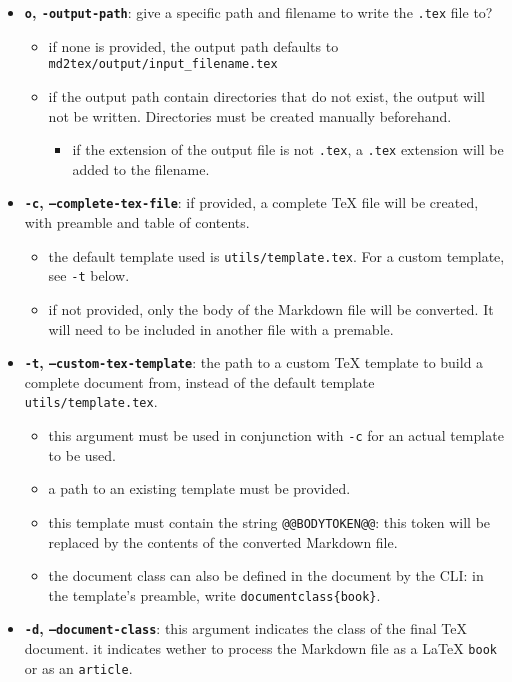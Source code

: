 \documentclass[a4paper, 12pt, twoside]{book}
\begin{document}
\begin{itemize}
\item \textbf{\texttt{o}, \texttt{-output-path}}: give a specific path and filename to write the \texttt{.tex} file to?
\begin{itemize} 
 \item if none is provided, the output path defaults to \texttt{md2tex/output/input\_filename.tex}
\item if the output path contain directories that do not exist, the output will not be 	 written. Directories must be created manually beforehand.
\begin{itemize} 
 \item if the extension of the output file is not \texttt{.tex}, a \texttt{.tex} extension will be added to the filename.
\end{itemize}
\end{itemize}
\item \textbf{\texttt{-c}, \texttt{--complete-tex-file}}: if provided, a complete TeX file will be created, with preamble and table of contents. 
\begin{itemize} 
 \item the default template used is \texttt{utils/template.tex}. For a custom template, see \texttt{-t} below.
\item if not provided, only the body of the Markdown file will be converted. It will need to be included 	 in another file with a premable.
\end{itemize}
\item \textbf{\texttt{-t}, \texttt{--custom-tex-template}}: the path to a custom TeX template to build a complete document from, instead of the default template \texttt{utils/template.tex}.
\begin{itemize} 
 \item this argument must be used in conjunction with \texttt{-c} for an actual template to be used.
\item a path to an existing template must be provided.
\item this template must contain the string \texttt{@@BODYTOKEN@@}: this token will be replaced by the contents of the 	 converted Markdown file.
\item the document class can also be defined in the document by the CLI: 	 in the template's preamble, write \texttt{documentclass\{book\}}.
\end{itemize}
\item \textbf{\texttt{-d}, \texttt{--document-class}}: this argument indicates the class of the final TeX document. it indicates wether to process the Markdown file as a LaTeX \texttt{book} or as an \texttt{article}.

\end{itemize}
\end{document}
